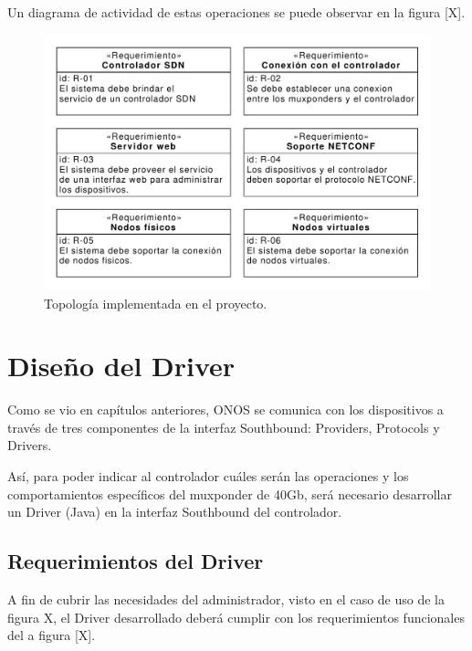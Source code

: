   Un diagrama de actividad de estas operaciones se puede observar en la figura [X].

  \begin{figure}[H]
    \centering
    \includegraphics[scale=0.65]{Figures/req_sys.pdf}
    \caption{Topología implementada en el proyecto.}
    \label{fig:req_sys}
  \end{figure}


  \section{Diseño del Driver}
  Como se vio en capítulos anteriores, ONOS se comunica con los dispositivos a través de tres componentes de la interfaz Southbound: Providers, Protocols y Drivers.
  
  Así, para poder indicar al controlador cuáles serán las operaciones y los comportamientos específicos del muxponder de 40Gb, será necesario desarrollar un Driver (Java) en la interfaz Southbound del controlador. 

  \subsection{Requerimientos del Driver}
  A fin de cubrir las necesidades del administrador, visto en el caso de uso de la figura X, el Driver desarrollado deberá cumplir con los requerimientos funcionales del a figura [X].
  
